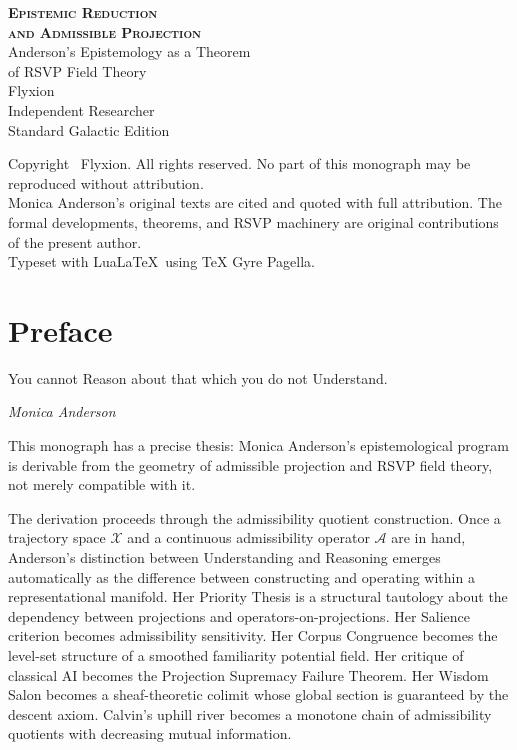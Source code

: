 \documentclass[12pt, a4paper, oneside]{book}
\newcommand{\Adm}{\mathcal{A}}
\newcommand{\X}{\mathcal{X}}
\begin{document}
\begin{titlepage}
  \begin{center}
    \vspace*{36mm}
    {\Huge\bfseries\scshape Epistemic Reduction\\[8pt]
    and Admissible Projection}\\[14pt]
    {\Large Anderson's Epistemology as a Theorem\\[4pt]
    of RSVP Field Theory}\\[44mm]
    {\large Flyxion}\\[8pt]
    {\normalsize Independent Researcher}\\[64mm]
    {\small Standard Galactic Edition}
  \end{center}
\end{titlepage}

\thispagestyle{empty}
\vspace*{\fill}
\noindent
Copyright \textcopyright\ Flyxion. All rights reserved.
No part of this monograph may be reproduced without attribution.\\[6pt]
\noindent
Monica Anderson's original texts are cited and quoted with full attribution.
The formal developments, theorems, and RSVP machinery are original
contributions of the present author.\\[6pt]
\noindent
Typeset with Lua\LaTeX\ using TeX Gyre Pagella.
\clearpage

\tableofcontents
\clearpage

\chapter*{Preface}

\epigraph{%
  You cannot Reason about that which you do not Understand.%
}{\textit{Monica Anderson}}

This monograph has a precise thesis: Monica Anderson's epistemological
program is derivable from the geometry of admissible projection and
RSVP field theory, not merely compatible with it.

The derivation proceeds through the admissibility quotient construction.
Once a trajectory space $\X$ and a continuous admissibility operator
$\Adm$ are in hand, Anderson's distinction between Understanding and
Reasoning emerges automatically as the difference between constructing
and operating within a representational manifold. Her Priority Thesis is
a structural tautology about the dependency between projections and
operators-on-projections. Her Salience criterion becomes admissibility
sensitivity. Her Corpus Congruence becomes the level-set structure of
a smoothed familiarity potential field. Her critique of classical AI
becomes the Projection Supremacy Failure Theorem. Her Wisdom Salon
becomes a sheaf-theoretic colimit whose global section is guaranteed
by the descent axiom. Calvin's uphill river becomes a monotone chain
of admissibility quotients with decreasing mutual information.
\end{document}

